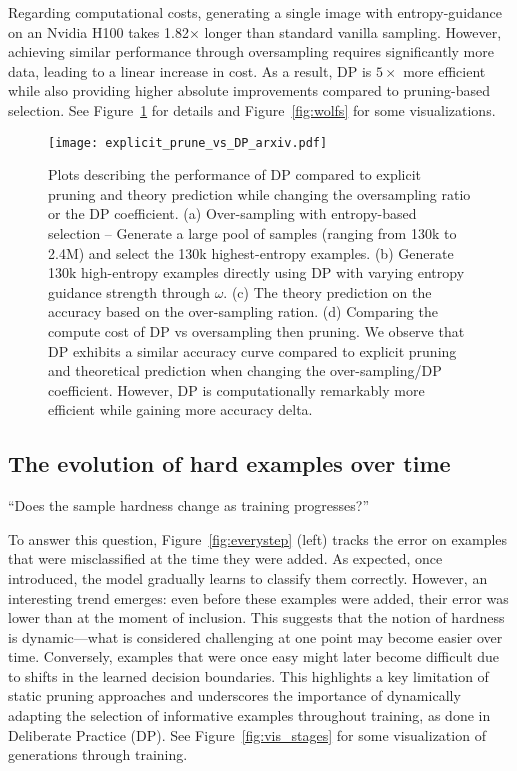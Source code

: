Regarding computational costs, generating a single image with entropy-guidance on an Nvidia H100 takes 1.82$\times$ longer than standard vanilla sampling. However, achieving similar performance through oversampling requires significantly more data, leading to a linear increase in cost. As a result, DP is $5\times$ more efficient while also providing higher absolute improvements compared to pruning-based selection. See Figure~\ref{fig:explicit_prune_vs_DP} for details and Figure~\ref{fig:wolfs} for some visualizations.


\begin{figure}[th]
    \centering
    \texttt{[image: explicit\_prune\_vs\_DP\_arxiv.pdf]}
    \caption{Plots describing the performance of DP compared to explicit pruning and theory prediction while changing the oversampling ratio or the DP coefficient. (a) Over-sampling with entropy-based selection – Generate a large pool of samples (ranging from 130k to 2.4M) and select the 130k highest-entropy examples. (b) Generate 130k high-entropy examples directly using DP with varying entropy guidance strength through $\omega$. (c) The theory prediction on the accuracy based on the over-sampling ration. (d) Comparing the compute cost of DP vs oversampling then pruning.
    We observe that DP exhibits a similar accuracy curve compared to explicit pruning and theoretical prediction when changing the over-sampling/DP coefficient. However, DP is computationally remarkably more efficient while gaining more accuracy delta.}
    \label{fig:explicit_prune_vs_DP}
    \vspace{-0.2cm}
\end{figure}

\subsection{The evolution of hard examples over time}

``Does the sample hardness change as training progresses?''

To answer this question, Figure~\ref{fig:everystep} (left) tracks the error on examples that were misclassified at the time they were added. As expected, once introduced, the model gradually learns to classify them correctly. However, an interesting trend emerges: even before these examples were added, their error was lower than at the moment of inclusion. This suggests that the notion of hardness is dynamic—what is considered challenging at one point may become easier over time. Conversely, examples that were once easy might later become difficult due to shifts in the learned decision boundaries. This highlights a key limitation of static pruning approaches and underscores the importance of dynamically adapting the selection of informative examples throughout training, as done in Deliberate Practice (DP). See Figure~\ref{fig:vis_stages} for some visualization of generations through training.

